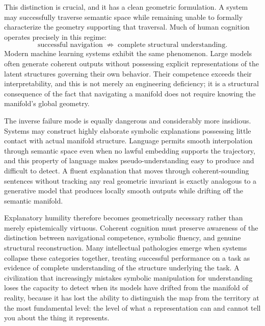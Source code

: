 \documentclass[11pt,a4paper,twocolumn]{article}
\begin{document}
This distinction is crucial, and it has a clean geometric
formulation. A system may successfully traverse semantic
space while remaining unable to formally characterize the
geometry supporting that traversal. Much of human cognition
operates precisely in this regime:
\[
\text{successful navigation}
\;\not\Rightarrow\;
\text{complete structural understanding}.
\]
Modern machine learning systems exhibit the same phenomenon.
Large models often generate coherent outputs without possessing
explicit representations of the latent structures governing
their own behavior. Their competence exceeds their
interpretability, and this is not merely an engineering
deficiency; it is a structural consequence of the fact that
navigating a manifold does not require knowing the manifold's
global geometry.

The inverse failure mode is equally dangerous and considerably
more insidious. Systems may construct highly elaborate symbolic
explanations possessing little contact with actual manifold
structure. Language permits smooth interpolation through
semantic space even when no lawful embedding supports the
trajectory, and this property of language makes
pseudo-understanding easy to produce and difficult to detect.
A fluent explanation that moves through coherent-sounding
sentences without tracking any real geometric invariant is
exactly analogous to a generative model that produces
locally smooth outputs while drifting off the semantic
manifold.

Explanatory humility therefore becomes geometrically
necessary rather than merely epistemically virtuous.
Coherent cognition must preserve awareness of the
distinction between navigational competence, symbolic
fluency, and genuine structural reconstruction. Many
intellectual pathologies emerge when systems collapse
these categories together, treating successful performance
on a task as evidence of complete understanding of the
structure underlying the task. A civilization that
increasingly mistakes symbolic manipulation for
understanding loses the capacity to detect when its
models have drifted from the manifold of reality, because
it has lost the ability to distinguish the map from
the territory at the most fundamental level: the level
of what a representation can and cannot tell you about
the thing it represents.

\end{document}
